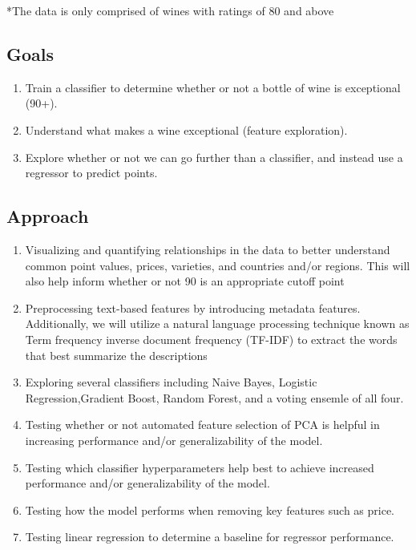 \documentclass[11pt]{article}
\providecommand{\tightlist}{%
      \setlength{\itemsep}{0pt}\setlength{\parskip}{0pt}}
\begin{document}
*The data is only comprised of wines with ratings of 80 and above

    \subsection{Goals}\label{goals}

\begin{enumerate}
\def\labelenumi{\arabic{enumi}.}
\tightlist
\item
  Train a classifier to determine whether or not a bottle of wine is
  exceptional (90+).
\item
  Understand what makes a wine exceptional (feature exploration).
\item
  Explore whether or not we can go further than a classifier, and
  instead use a regressor to predict points.
\end{enumerate}

    \subsection{Approach}\label{approach}

\begin{enumerate}
\def\labelenumi{\arabic{enumi}.}
\tightlist
\item
  Visualizing and quantifying relationships in the data to better
  understand common point values, prices, varieties, and countries
  and/or regions. This will also help inform whether or not 90 is an
  appropriate cutoff point
\item
  Preprocessing text-based features by introducing metadata features.
  Additionally, we will utilize a natural language processing technique
  known as Term frequency inverse document frequency (TF-IDF) to extract
  the words that best summarize the descriptions
\item
  Exploring several classifiers including Naive Bayes, Logistic
  Regression,Gradient Boost, Random Forest, and a voting ensemle of all
  four.
\item
  Testing whether or not automated feature selection of PCA is helpful
  in increasing performance and/or generalizability of the model.
\item
  Testing which classifier hyperparameters help best to achieve
  increased performance and/or generalizability of the model.
\item
  Testing how the model performs when removing key features such as
  price.
\item
  Testing linear regression to determine a baseline for regressor
  performance.
\end{enumerate}
\end{document}
